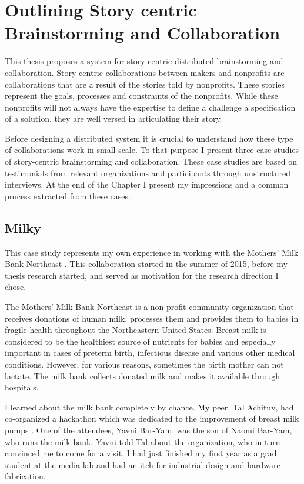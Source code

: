 \chapter{Outlining Story centric Brainstorming and Collaboration }
\label{chap_anatomy}

This thesis proposes a system for story-centric distributed brainstorming and collaboration. Story-centric collaborations between makers and nonprofits are collaborations that are a result of the stories told by nonprofits. These stories represent the goals, processes and constraints of the nonprofits. While these nonprofits will not always have the expertise to define a challenge a specification of a solution, they are well versed in articulating their story.

Before designing a distributed system it is crucial to understand how these type of collaborations work in small scale. To that purpose I present three case studies of story-centric brainstorming and collaboration. These case studies are based on testimonials from relevant organizations and participants through unstructured interviews. At the end of the Chapter I present my impressions and a common process extracted from these cases. 

\section{Milky}
This case study represents my own experience in working with the Mothers' Milk Bank Northeast \cite{mmne}. This collaboration started in the summer of 2015, before my thesis research started, and served as motivation for the research direction I chose.

The Mothers' Milk Bank Northeast is a non profit community organization that receives donations of human milk, processes them and provides them to babies in fragile health throughout the Northeastern United States. Breast milk is considered to be the healthiest source of nutrients for babies and especially important in cases of preterm birth, infectious disease and various other medical conditions.\cite{lewandowski} However, for various reasons, sometimes the birth mother can not lactate. The milk bank collects donated milk and makes it available through hospitals. 

I learned about the milk bank completely by chance. My peer, Tal Achituv, had co-organized a hackathon which was dedicated to the improvement of breast milk pumps \cite{d2016feminist}. One of the attendees, Yavni Bar-Yam, was the son of Naomi Bar-Yam, who runs the milk bank. Yavni told Tal about the organization, who in turn convinced me to come for a visit. I had just finished my first year as a grad student at the media lab and had an itch for industrial design and hardware fabrication.


